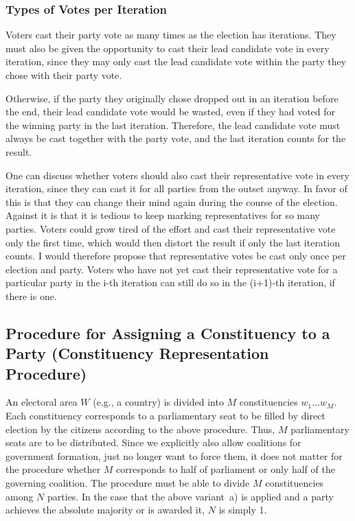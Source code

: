 \subsubsection{Types of Votes per Iteration}

Voters cast their party vote as many times as the election has iterations.
They must also be given the opportunity to cast their lead candidate vote in every iteration, since they may only cast the lead candidate vote within the party they chose with their party vote.

Otherwise, if the party they originally chose dropped out in an iteration before the end, their lead candidate vote would be wasted, even if they had voted for the winning party in the last iteration.
Therefore, the lead candidate vote must always be cast together with the party vote, and the last iteration counts for the result.

One can discuss whether voters should also cast their representative vote in every iteration, since they can cast it for all parties from the outset anyway.
In favor of this is that they can change their mind again during the course of the election.
Against it is that it is tedious to keep marking representatives for so many parties.
Voters could grow tired of the effort and cast their representative vote only the first time, which would then distort the result if only the last iteration counts.
I would therefore propose that representative votes be cast only once per election and party.
Voters who have not yet cast their representative vote for a particular party in the i-th iteration can still do so in the (i+1)-th iteration, if there is one.

\subsection{Procedure for Assigning a Constituency to a Party (Constituency Representation Procedure)}

An electoral area $W$ (e.g., a country) is divided into $M$ constituencies $w_1 \ldots w_M$. Each
constituency corresponds to a parliamentary seat to be filled by direct election by the citizens according to the above procedure.
Thus, $M$ parliamentary seats are to be distributed. Since we explicitly also
allow coalitions for government formation, just no longer want to force them, it does not matter for the
procedure whether $M$ corresponds to half of parliament or only half of the governing coalition.
The procedure must be able to divide $M$ constituencies among $N$ parties. In the case that
the above variant~a) is applied and a party achieves the absolute majority or is
awarded it, $N$ is simply 1.

